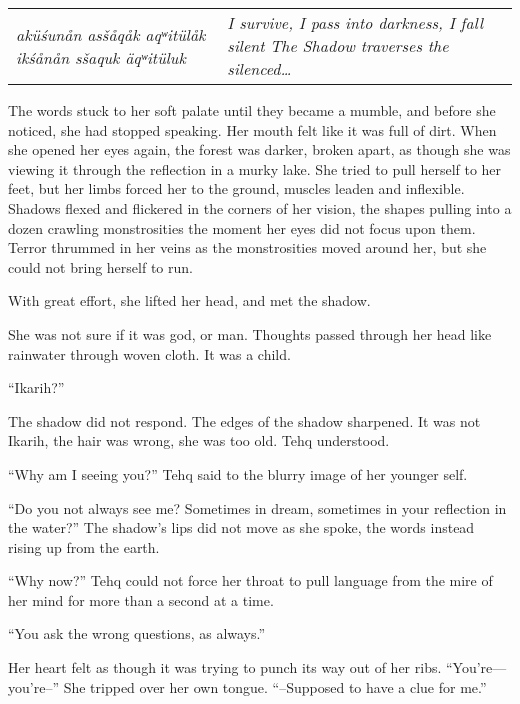 \vspace{1em}

\setlength{\tabcolsep}{3pt}
\noindent\begin{tabular}{p{} p{}}
\noindent\emph{aküśunån asšåqåk aqʷitülåk} \newline \emph{ikśånån sšaquk äqʷitüluk}
&
\noindent\emph{I survive, I pass into darkness, I fall silent} \newline \emph{The Shadow traverses the silenced\ldots{}}
\end{tabular}

\vspace{1em}

The words stuck to her soft palate until they became a mumble, and before she noticed, she had stopped speaking. Her mouth felt like it was full of dirt. When she opened her eyes again, the forest was darker, broken apart, as though she was viewing it through the reflection in a murky lake. She tried to pull herself to her feet, but her limbs forced her to the ground, muscles leaden and inflexible. Shadows flexed and flickered in the corners of her vision, the shapes pulling into a dozen crawling monstrosities the moment her eyes did not focus upon them. Terror thrummed in her veins as the monstrosities moved around her, but she could not bring herself to run.

With great effort, she lifted her head, and met the shadow.

She was not sure if it was god, or man. Thoughts passed through her head like rainwater through woven cloth. It was a child.

``Ikarih?''

The shadow did not respond. The edges of the shadow sharpened. It was not Ikarih, the hair was wrong, she was too old. Tehq understood.

``Why am I seeing you?'' Tehq said to the blurry image of her younger self.

``Do you not always see me? Sometimes in dream, sometimes in your reflection in the water?'' The shadow's lips did not move as she spoke, the words instead rising up from the earth.

``Why now?'' Tehq could not force her throat to pull language from the mire of her mind for more than a second at a time.

``You ask the wrong questions, as always.''

Her heart felt as though it was trying to punch its way out of her ribs. ``You're---you're--'' She tripped over her own tongue. ``--Supposed to have a clue for me.''

